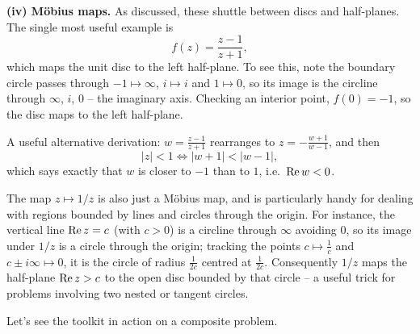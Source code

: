 \documentclass[a4paper]{scrartcl}
\begin{document}
\textbf{(iv) M\"obius maps.} As discussed, these shuttle between discs and half-planes. The single most useful example is
$$
f(z) = \frac{z - 1}{z + 1},
$$
which maps the unit disc to the left half-plane. To see this, note the boundary circle passes through $-1 \mapsto \infty$, $i \mapsto i$ and $1 \mapsto 0$, so its image is the circline through $\infty$, $i$, $0$ -- the imaginary axis. Checking an interior point, $f(0) = -1$, so the disc maps to the left half-plane.
\begin{center}
\end{center}
A useful alternative derivation: $w = \frac{z-1}{z+1}$ rearranges to $z = -\frac{w+1}{w-1}$, and then
$$
|z| < 1 \iff |w + 1| < |w - 1|,
$$
which says exactly that $w$ is closer to $-1$ than to $1$, i.e.\ $\operatorname{Re} w < 0$.

The map $z \mapsto 1/z$ is also just a M\"obius map, and is particularly handy for dealing with regions bounded by lines and circles through the origin. For instance, the vertical line $\operatorname{Re} z = c$ (with $c > 0$) is a circline through $\infty$ avoiding $0$, so its image under $1/z$ is a circle through the origin; tracking the points $c \mapsto \frac 1c$ and $c \pm i\infty \mapsto 0$, it is the circle of radius $\frac{1}{2c}$ centred at $\frac{1}{2c}$. Consequently $1/z$ maps the half-plane $\operatorname{Re} z > c$ to the open disc bounded by that circle -- a useful trick for problems involving two nested or tangent circles.

Let's see the toolkit in action on a composite problem.
\end{document}
